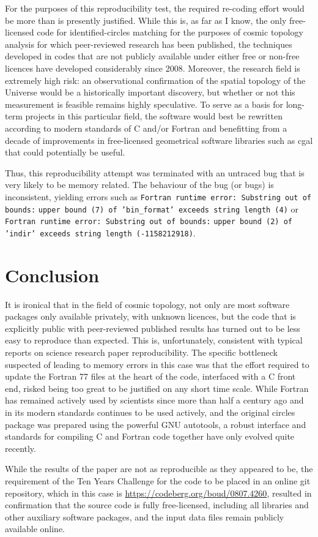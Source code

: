 For the purposes of this reproducibility test, the required re-coding
effort would be more than is presently justified. While this is, as
far as I know, the only free-licensed code for identified-circles
matching for the purposes of cosmic topology analysis for which
peer-reviewed research has been published, the techniques developed in
codes that are not publicly available under either free or non-free
licences have developed considerably since 2008.  Moreover, the
research field is extremely high risk: an observational confirmation
of the spatial topology of the Universe would be a historically
important discovery, but whether or not this measurement is feasible
remains highly speculative. To serve as a basis for long-term
projects in this particular field, the software would best be
rewritten according to modern standards of C and/or Fortran and
benefitting from a decade of improvements in free-licensed geometrical
software libraries such as {\sc cgal} that could potentially be
useful.

Thus, this reproducibility attempt was terminated with
an untraced bug that is very likely to be memory related. The behaviour
of the bug (or bugs) is inconsistent, yielding errors such as
\mbox{{\tt Fortran runtime error: Substring out of bounds:}}
\mbox{{\tt upper bound (7) of 'bin\_format' exceeds string length (4)}} or
\mbox{{\tt Fortran runtime error: Substring out of bounds:}}
\mbox{{\tt upper bound (2) of 'indir' exceeds string length (-1158212918)}}.
\sloppy

\section{Conclusion}

\fussy
It is ironical that in the field of cosmic topology, not only are most
software packages only available privately, with unknown licences, but
the code that is explicitly public with peer-reviewed published
results has turned out to be less easy to reproduce than
expected. This is, unfortunately, consistent with typical reports on
science research paper reproducibility.  The specific bottleneck
suspected of leading to memory errors in this case was that the effort
required to update the Fortran 77 files at the heart of the code,
interfaced with a C front end, risked being too great to be justified
on any short time scale. While Fortran has remained actively used by
scientists since more than half a century ago and in its modern
standards continues to be used actively, and the original {\sc
  circles} package was prepared using the powerful GNU {\sc
  autotools}, a robust interface and standards for compiling C and
Fortran code together have only evolved quite recently.

While the results of the paper are not as reproducible as they
appeared to be, the requirement of the Ten Years Challenge
for the code to be placed in an online git repository,
which in this case is \url{https://codeberg.org/boud/0807.4260},
resulted in confirmation that the source code is
fully free-licensed, including all libraries and other
auxiliary software packages, and the input data files
remain publicly available online.
